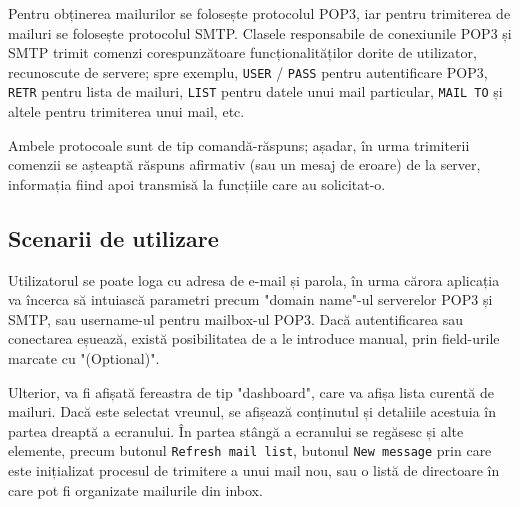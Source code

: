 \documentclass[runningheads]{llncs}
\begin{document}
Pentru obținerea mailurilor se folosește protocolul POP3\cite{ref_rfc_pop3}, iar pentru trimiterea de mailuri se folosește protocolul SMTP\cite{ref_rfc_smtp}. Clasele responsabile de conexiunile POP3 și SMTP trimit comenzi corespunzătoare funcționalităților dorite de utilizator, recunoscute de servere; spre exemplu, \texttt{USER} / \texttt{PASS} pentru autentificare POP3, \texttt{RETR} pentru lista de mailuri, \texttt{LIST} pentru datele unui mail particular, \texttt{MAIL TO} și altele pentru trimiterea unui mail, etc.

Ambele protocoale sunt de tip comandă-răspuns; așadar, în urma trimiterii comenzii se așteaptă răspuns afirmativ (sau un mesaj de eroare) de la server, informația fiind apoi transmisă la funcțiile care au solicitat-o.

\subsection{Scenarii de utilizare}


Utilizatorul se poate loga cu adresa de e-mail și parola, în urma cărora aplicația va încerca să intuiască parametri precum "domain name"-ul serverelor POP3 și SMTP, sau username-ul pentru mailbox-ul POP3. Dacă autentificarea sau conectarea eșuează, există posibilitatea de a le introduce manual, prin field-urile marcate cu "(Optional)".

Ulterior, va fi afișată fereastra de tip "dashboard", care va afișa lista curentă de mailuri. Dacă este selectat vreunul, se afișează conținutul și detaliile acestuia în partea dreaptă a ecranului. În partea stângă a ecranului se regăsesc și alte elemente, precum butonul \texttt{Refresh mail list}, butonul \texttt{New message} prin care este inițializat procesul de trimitere a unui mail nou, sau o listă de directoare în care pot fi organizate mailurile din inbox.
\end{document}
